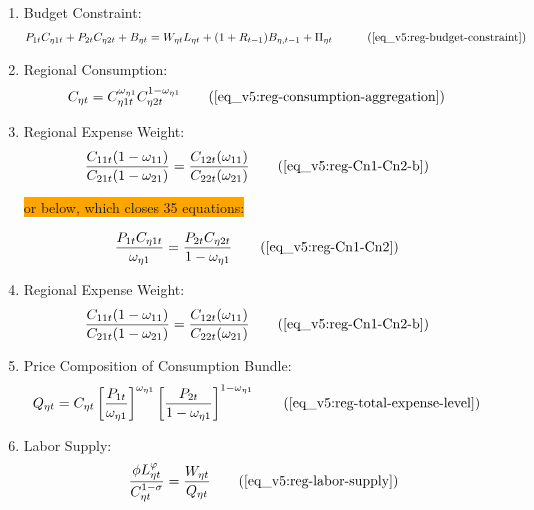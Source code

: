 \documentclass[../thesis.tex]{subfiles}
\begin{document}
{\begin{itemize}
\begin{enumerate}
		\item Budget Constraint:
		\begin{align}
		\begin{split}
			& P_{1 t} C_{\eta 1 t} + P_{2 t} C_{\eta 2 t} + B_{\eta t} =
			 W_{\eta t} L_{\eta t} + (1 + R_{t-1}) B_{\eta,t-1} + \Pi_{\eta t}
		\end{split} \tag{\ref{eq_v5:reg-budget-constraint}}
		\end{align}

		\item Regional Consumption:
		\begin{align}
			C_{\eta t} &= C_{\eta 1 t}^{\omega_{\eta 1}} C_{\eta 2 t}^{1-\omega_{\eta 1}} \tag{\ref{eq_v5:reg-consumption-aggregation}} 
		\end{align}
			
		\item Regional Expense Weight:
		\begin{align}
			\frac{C_{11t}(1-\omega_{11})}{C_{21t}(1-\omega_{21})} &= \frac{C_{12t}(\omega_{11})}{C_{22t}(\omega_{21})} \tag{\ref{eq_v5:reg-Cn1-Cn2-b}}
		\end{align}
		
		\colorbox{orange}{or below, which closes 35 equations:}
		
		\begin{align}
			\frac{P_{1 t} C_{\eta 1 t}}{\omega_{\eta 1}} &= \frac{P_{2 t} C_{\eta 2 t}}{1 -\omega_{\eta 1}} \tag{\ref{eq_v5:reg-Cn1-Cn2}}
		\end{align}
		
		
		\item Regional Expense Weight:
		\begin{align}
			\frac{C_{11t}(1-\omega_{11})}{C_{21t}(1-\omega_{21})} &= \frac{C_{12t}(\omega_{11})}{C_{22t}(\omega_{21})} \tag{\ref{eq_v5:reg-Cn1-Cn2-b}}
		\end{align}
		
		\item Price Composition of Consumption Bundle:
		\begin{align}
			Q_{\eta t} &= C_{\eta t} \left[ \frac{P_{1 t}}{\omega_{\eta 1}} \right]^{\omega_{\eta 1}} \left[ \frac{P_{2 t}}{1 -\omega_{\eta 1}} \right]^{1 -\omega_{\eta 1}} \tag{\ref{eq_v5:reg-total-expense-level}}
		\end{align}

		\item Labor Supply:
		\begin{align}
			\frac{\phi L_{\eta t}^{\varphi}}{C_{\eta t}^{1-\sigma}} = \frac{W_{\eta t}}{Q_{\eta t}} \tag{\ref{eq_v5:reg-labor-supply}}
		\end{align}


\end{enumerate}
\end{itemize}}
\end{document}
